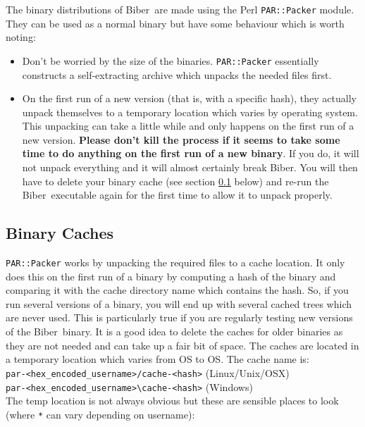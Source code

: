 \documentclass{ltxdockit}
\newcommand*{\biber}{Biber\xspace}
\begin{document}
The binary distributions of \biber\ are made using the Perl \verb+PAR::Packer+
module. They can be used as a normal binary but have some behaviour which
is worth noting:

\begin{itemize}
\item Don't be worried by the size of the binaries. \verb+PAR::Packer+ essentially
  constructs a self-extracting archive which unpacks the needed files first.
\item On the first run of a new version (that is, with a specific hash),
  they actually unpack themselves to a temporary location which varies by
  operating system. This unpacking can take a little while and only happens
  on the first run of a new version. \textbf{Please don't kill the process
    if it seems to take some time to do anything on the first run of a new
    binary}. If you do, it will not unpack everything and it will almost
  certainly break \biber. You will then have to delete your binary
  cache (see section \ref{bc} below) and re-run the \biber\ executable
  again for the first time to allow it to unpack properly.
\end{itemize}

\subsection{Binary Caches}\label{bc}

\verb+PAR::Packer+ works by unpacking the required files to a cache
location. It only does this on the first run of a binary 
by computing a hash of the binary and comparing it with
the cache directory name which contains the hash. So, if you run
several versions of a binary, you will end up with several cached
trees which are never used. This is particularly true if you are regularly
testing new versions of the \biber\ binary. It is a good idea to
delete the caches for older binaries as they are not needed and can take up
a fair bit of space. The caches are located in a temporary location which
varies from OS to OS. The cache name is:\\[1ex]

\noindent\verb+par-<hex_encoded_username>/cache-<hash>+ (Linux/Unix/OSX)\\
\verb+par-<hex_encoded_username>\cache-<hash>+ (Windows)\\[1ex]

\noindent The temp location is not always obvious but these are sensible
places to look (where \verb+*+ can vary depending on username):
\end{document}

